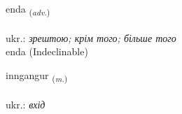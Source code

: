 \documentclass[frontgrid, backgrid]{flacards}\usepackage[]{graphicx}\usepackage[]{xcolor}
\begin{document}

\renewcommand{\flhead}{\vskip5pt \fboxsep=0pt {\small\bfseries\footnotesize Atviksorð | прислівник}}
\renewcommand{\fcfoot}{\vskip5pt \fboxsep=0pt \hspace{2pt}{\small\bfseries\footnotesize 3K}}

\renewcommand{\blhead}{\vskip5pt {\small\bfseries\footnotesize Atviksorð | прислівник }}
\renewcommand{\bcfoot}{\vskip5pt \hspace{2pt}{\small\bfseries\footnotesize 3K}}


{enda \small{\textsubscript{(\textit{adv.})}} \\[1ex]
\textphonetic{[ɛnta]} \\
ukr.: \emph{зрештою; крім того; більше того} \\  [2ex]
enda (Indeclinable)}

\renewcommand{\flhead}{\vskip5pt \fboxsep=0pt {\small\bfseries\footnotesize Nafnorð | іменник}}
\renewcommand{\fcfoot}{\vskip5pt \fboxsep=0pt \hspace{2pt}{\small\bfseries\footnotesize 3K}}

\renewcommand{\blhead}{\vskip5pt {\small\bfseries\footnotesize Nafnorð | іменник }}
\renewcommand{\bcfoot}{\vskip5pt \hspace{2pt}{\small\bfseries\footnotesize 3K}}


{inngangur \small{\textsubscript{(\textit{m.})}} \\[1ex] %
\textphonetic{[ɪŋkauŋkʏr]} \\
ukr.: \emph{вхід} \\  [2ex]
\renewcommand*{\arraystretch}{0.8}
}

\renewcommand{\flhead}{\vskip5pt \fboxsep=0pt {\small\bfseries\footnotesize Sagnorð | дієслово}}
\renewcommand{\fcfoot}{\vskip5pt \fboxsep=0pt \hspace{2pt}{\small\bfseries\footnotesize 3K}}
\end{document}
